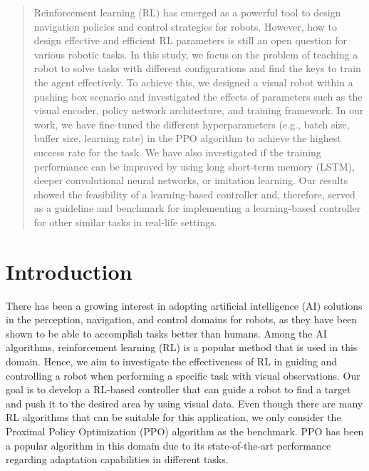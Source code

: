 \documentclass{article}
\begin{document}

\begin{abstract}
Reinforcement learning (RL) has emerged as a powerful tool to design navigation policies and control strategies for robots. However, how to design effective and efficient RL parameters is still an open question for various robotic tasks. In this study, we focus on the problem of teaching a robot to solve tasks with different configurations and find the keys to train the agent effectively. To achieve this, we designed a visual robot within a pushing box scenario and investigated the effects of parameters such as the visual encoder, policy network architecture, and training framework. In our work, we have fine-tuned the different hyperparameters (e.g., batch size, buffer size, learning rate) in the PPO algorithm to achieve the highest success rate for the task. We have also investigated if the training performance can be improved by using long short-term memory (LSTM), deeper convolutional neural networks, or imitation learning. Our results showed the feasibility of a learning-based controller and, therefore, served as a guideline and benchmark for implementing a learning-based controller for other similar tasks in real-life settings.
\end{abstract}

\section{Introduction}

There has been a growing interest in adopting artificial intelligence (AI) solutions in the perception, navigation, and control domains for robots, as they have been shown to be able to accomplish tasks better than humans. Among the AI algorithms, reinforcement learning (RL) \cite{kaelbling1996reinforcement} is a popular method that is used in this domain. Hence, we aim to investigate the effectiveness of RL in guiding and controlling a robot when performing a specific task with visual observations. Our goal is to develop a RL-based controller that can guide a robot to find a target and push it to the desired area by using visual data. Even though there are many RL algorithms that can be suitable for this application, we only consider the Proximal Policy Optimization (PPO) algorithm \cite{openai_ppo} as the benchmark. PPO has been a popular algorithm in this domain due to its state-of-the-art performance regarding adaptation capabilities in different tasks.
\end{document}
